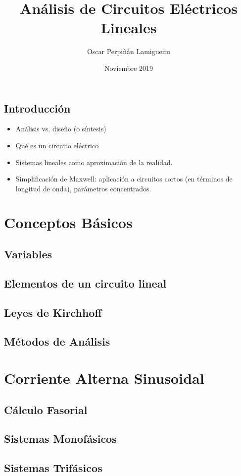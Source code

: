 \documentclass[a4paper]{memoir}
\author{Oscar Perpiñán Lamigueiro}
\date{Noviembre 2019}
\title{Análisis de Circuitos Eléctricos Lineales}
\begin{document}
\maketitle
\frontmatter

\cleardoublepage

\setcounter{tocdepth}{1}
\tableofcontents

\mainmatter
\chapter{Introducción}
\label{sec:org0b61e69}
\label{sec:intro}

\begin{itemize}
\item Análisis vs. diseño (o síntesis)
\item Qué es un circuito eléctrico
\item Sistemas lineales como aproximación de la realidad.
\item Simplificación de Maxwell: aplicación a circuitos cortos (en términos de longitud de onda), parámetros concentrados.
\end{itemize}
\part{Conceptos Básicos}
\label{sec:orgca76cb1}
\label{part:conceptos-basicos}

\chapter{Variables}
\label{sec:org1f54978}

\chapter{Elementos de un circuito lineal}
\label{sec:org8aa5830}
\chapter{Leyes de Kirchhoff}
\label{sec:org1072ca5}
\chapter{Métodos de Análisis}
\label{sec:org771e368}
\label{sec:metodos-analisis}
\part{Corriente Alterna Sinusoidal}
\label{sec:orgc109175}
\label{part:corriente-alterna}
\chapter{Cálculo Fasorial}
\label{sec:org9ead4bc}
\label{sec:calculo-fasorial}
\chapter{Sistemas Monofásicos}
\label{sec:org18e3040}
\label{sec:sistemas-monofasicos}
\chapter{Sistemas Trifásicos}
\label{sec:org658ff2d}
\label{sec:sistemas-trifasicos}
\end{document}
